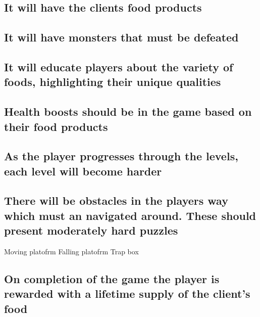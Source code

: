 \documentclass{article}
\begin{document}
\subsection{ It will have the clients food products }
\subsection{ It will have monsters that must be defeated }
\subsection{ It will educate players about the variety of foods, highlighting their unique qualities }
\subsection{ Health boosts should be in the game based on their food products }
\subsection{ As the player progresses through the levels, each level will become harder }
\subsection{ There will be obstacles in the players way which must an navigated around. These should present moderately hard puzzles }
Moving platofrm
Falling platofrm
Trap box

\subsection{ On completion of the game the player is rewarded with a lifetime supply of the client's food }



\end{document}
